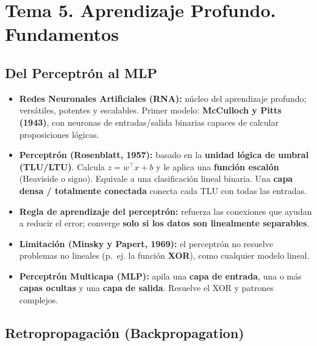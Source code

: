 \documentclass[12pt]{book} %
\providecommand{\tightlist}{%
  \setlength{\itemsep}{0pt}\setlength{\parskip}{0pt}}
\begin{document}
\hypertarget{tema-5.-aprendizaje-profundo.-fundamentos}{%
\section{Tema 5. Aprendizaje Profundo.
Fundamentos}\label{tema-5.-aprendizaje-profundo.-fundamentos}}

\hypertarget{del-perceptruxf3n-al-mlp}{%
\subsection{Del Perceptrón al MLP}\label{del-perceptruxf3n-al-mlp}}

\begin{itemize}
\tightlist
\item
  \textbf{Redes Neuronales Artificiales (RNA):} núcleo del aprendizaje
  profundo; versátiles, potentes y escalables. Primer modelo:
  \textbf{McCulloch y Pitts (1943)}, con neuronas de entradas/salida
  binarias capaces de calcular proposiciones lógicas.
\item
  \textbf{Perceptrón (Rosenblatt, 1957):} basado en la \textbf{unidad
  lógica de umbral (TLU/LTU)}. Calcula \(z = w^\top x + b\) y le aplica
  una \textbf{función escalón} (Heaviside o signo). Equivale a una
  clasificación lineal binaria. Una \textbf{capa densa / totalmente
  conectada} conecta cada TLU con todas las entradas.
\item
  \textbf{Regla de aprendizaje del perceptrón:} refuerza las conexiones
  que ayudan a reducir el error; converge \textbf{solo si los datos son
  linealmente separables}.
\item
  \textbf{Limitación (Minsky y Papert, 1969):} el perceptrón no resuelve
  problemas no lineales (p.~ej. la función \textbf{XOR}), como cualquier
  modelo lineal.
\item
  \textbf{Perceptrón Multicapa (MLP):} apila una \textbf{capa de
  entrada}, una o más \textbf{capas ocultas} y una \textbf{capa de
  salida}. Resuelve el XOR y patrones complejos.
\end{itemize}

\hypertarget{retropropagaciuxf3n-backpropagation}{%
\subsection{Retropropagación
(Backpropagation)}\label{retropropagaciuxf3n-backpropagation}}
\end{document}
